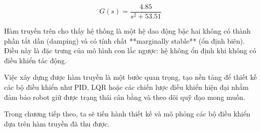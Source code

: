         \[
        G(s) = \frac{4.85}{s^2 + 53.51}
        \]
        
        Hàm truyền trên cho thấy hệ thống là một hệ dao động bậc hai không có thành phần tắt dần (damping) và có tính chất **marginally stable** (ổn định biên). Điều này là đặc trưng của mô hình con lắc ngược: hệ không ổn định khi không có điều khiển tác động.
        
        Việc xây dựng được hàm truyền là một bước quan trọng, tạo nền tảng để thiết kế các bộ điều khiển như PID, LQR hoặc các chiến lược điều khiển hiện đại nhằm đảm bảo robot giữ được trạng thái cân bằng và theo dõi quỹ đạo mong muốn.
        
        Trong chương tiếp theo, ta sẽ tiến hành thiết kế và mô phỏng các bộ điều khiển dựa trên hàm truyền đã thu được.
            
        
       